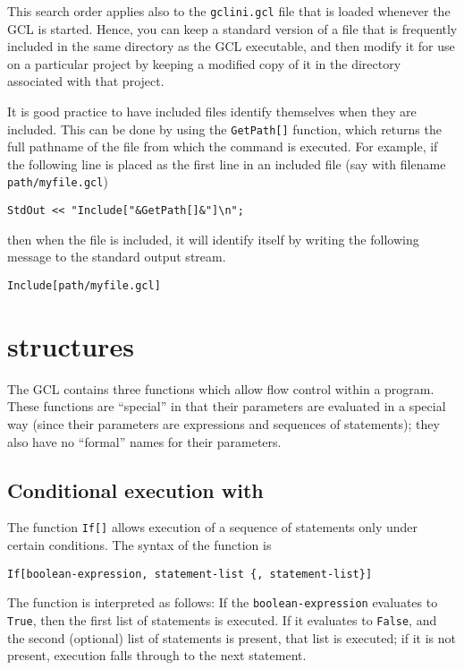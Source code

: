 This search order applies also to the \verb+gclini.gcl+ file that is
loaded whenever the GCL is started.  Hence, you can keep a standard
version of a file that is frequently included in the same directory as
the GCL executable, and then modify it for use on a particular project
by keeping a modified copy of it in the directory associated with that
project.  

It is good practice to have included files identify themselves when
they are included. This can be done by using the
\verb+GetPath[]+ function, which returns the full
pathname of the file from which the command is executed.  For example,
if the following line is placed as the first line in an included file
(say with filename \verb+path/myfile.gcl+)

\begin{verbatim}
StdOut << "Include["&GetPath[]&"]\n";
\end{verbatim}

\noindent
then when the file is included, it will identify itself by writing
the following message to the standard output stream.  

\begin{verbatim}
Include[path/myfile.gcl]
\end{verbatim}


\section{ structures}

The GCL contains three functions which allow flow control within a
program.  These functions are ``special'' in that their parameters are
evaluated in a special way (since their parameters are expressions and
sequences of statements); they also have no ``formal'' names for their
parameters.

\subsection{Conditional execution with }

The function \verb+If[]+ allows execution of a sequence of statements
only under certain conditions.  The syntax of the function is

\begin{verbatim}
If[boolean-expression, statement-list {, statement-list}]
\end{verbatim}

\noindent The function is interpreted as follows: If the
\verb+boolean-expression+ evaluates to \verb+True+, then the first
list of statements is executed.  If it evaluates to \verb+False+, and
the second (optional) list of statements is present, that list is
executed; if it is not present, execution falls through to the next
statement.

